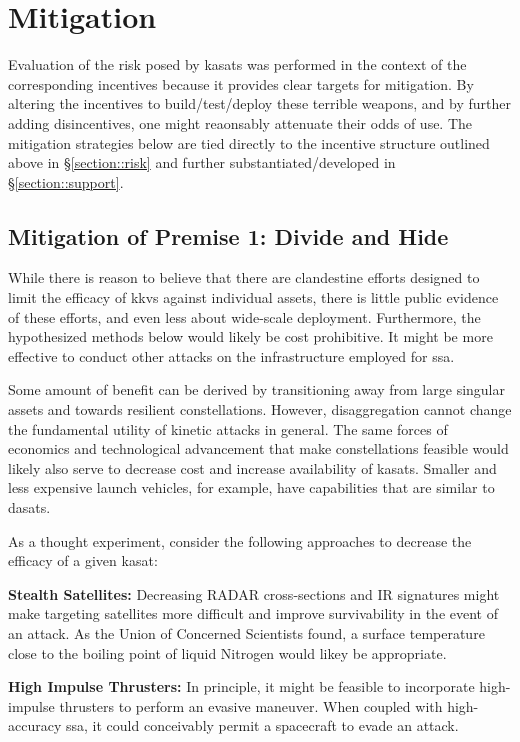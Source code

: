 \section{Mitigation}

Evaluation of the risk posed by \acp{kasat} was performed in the
context of the corresponding incentives because it provides clear
targets for mitigation.  By altering the incentives to
build/test/deploy these terrible weapons, and by further adding
disincentives, one might reaonsably attenuate their odds of use.  The
mitigation strategies below are tied directly to the incentive
structure outlined above in \S\ref{section::risk} and further
substantiated/developed in \S\ref{section::support}.

\subsection{Mitigation of Premise 1: Divide and Hide}
\label{section::mitigation::1}

While there is reason to believe that there are clandestine efforts
designed to limit the efficacy of \acp{kkv} against individual assets,
there is little public evidence of these efforts, and even less about
wide-scale deployment.  Furthermore, the hypothesized methods below
would likely be cost prohibitive.  It might be more effective to
conduct other attacks on the infrastructure employed for \acf{ssa}.

Some amount of benefit can be derived by transitioning away from large
singular assets and towards resilient constellations.  However,
disaggregation cannot change the fundamental utility of kinetic
attacks in general.  The same forces of economics and technological
advancement that make constellations feasible would likely also serve
to decrease cost and increase availability of \acp{kasat}.  Smaller
and less expensive launch vehicles, for example, have capabilities
that are similar to \acp{dasat}.

As a thought experiment, consider the following approaches to decrease
the efficacy of a given \ac{kasat}:

\textbf{Stealth Satellites:} Decreasing RADAR cross-sections and IR
signatures might make targeting satellites more difficult and improve
survivability in the event of an attack.  As the Union of Concerned
Scientists found, a surface temperature close to the boiling point of
liquid Nitrogen would likey be appropriate.\cite[p48]{abm-me-not}

\textbf{High Impulse Thrusters:} In principle, it might be feasible to
incorporate high-impulse thrusters to perform an evasive maneuver.
When coupled with high-accuracy \ac{ssa}, it could conceivably permit
a spacecraft to evade an attack.

